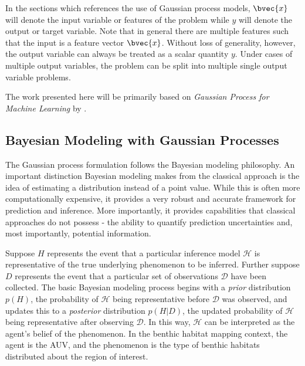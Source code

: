 		In the sections which references the use of Gaussian process models, $\bvec{x}$ will denote the input variable or features of the problem while $y$ will denote the output or target variable. Note that in general there are multiple features such that the input is a feature vector $\bvec{x}$. Without loss of generality, however, the output variable can always be treated as a scalar quantity $y$. Under cases of multiple output variables, the problem can be split into multiple single output variable problems.
		
		

		The work presented here will be primarily based on \textit{Gaussian Process for Machine Learning} by \cite{GaussianProcessForMachineLearning}. 

		\subsection{Bayesian Modeling with Gaussian Processes}
		\label{Background:GaussianProcesses:BayesianModeling}
		
			The Gaussian process formulation follows the Bayesian modeling philosophy. An important distinction Bayesian modeling makes from the classical approach is the idea of estimating a distribution instead of a point value. While this is often more computationally expensive, it provides a very robust and accurate framework for prediction and inference. More importantly, it provides capabilities that classical approaches do not possess - the ability to quantify prediction uncertainties and, most importantly, potential information. 
			
			Suppose $H$ represents the event that a particular inference model $\mathcal{H}$ is representative of the true underlying phenomenon to be inferred. Further suppose $D$ represents the event that a particular set of observations $\mathcal{D}$ have been collected. The basic Bayesian modeling process begins with a \textit{prior} distribution $p(H)$, the probability of $\mathcal{H}$ being representative before $\mathcal{D}$ was observed, and updates this to a \textit{posterior} distribution $p(H | D)$, the updated probability of $\mathcal{H}$ being representative after observing $\mathcal{D}$. In this way, $\mathcal{H}$ can be interpreted as the agent's belief of the phenomenon. In the benthic habitat mapping context, the agent is the AUV, and the phenomenon is the type of benthic habitats distributed about the region of interest.
			
